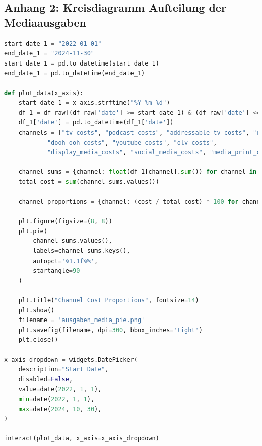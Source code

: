 \documentclass{common/nak}
\numberwithin{equation}{subsection}
\begin{document}
\subsection*{Anhang 2: Kreisdiagramm Aufteilung der Mediaausgaben}
\label{Anhang2KreisdiagrammAufteilungDerMediaausgaben}
\begin{lstlisting}[language=Python, linewidth=\textwidth]
start_date_1 = "2022-01-01"
end_date_1 = "2024-11-30"
start_date_1 = pd.to_datetime(start_date_1)
end_date_1 = pd.to_datetime(end_date_1)

def plot_data(x_axis):
    start_date_1 = x_axis.strftime("%Y-%m-%d")
    df_1 = df_raw[(df_raw['date'] >= start_date_1) & (df_raw['date'] <= end_date_1)].copy() 
    df_1['date'] = pd.to_datetime(df_1['date'])
    channels = ["tv_costs", "podcast_costs", "addressable_tv_costs", "radio_costs", 
            "dooh_ooh_costs", "youtube_costs", "olv_costs", 
            "display_media_costs", "social_media_costs", "media_print_costs"]

    channel_sums = {channel: float(df_1[channel].sum()) for channel in channels}
    total_cost = sum(channel_sums.values())

    channel_proportions = {channel: (cost / total_cost) * 100 for channel, cost in channel_sums.items()}

    plt.figure(figsize=(8, 8))
    plt.pie(
        channel_sums.values(),
        labels=channel_sums.keys(),
        autopct='%1.1f%%',
        startangle=90
    )

    plt.title("Channel Cost Proportions", fontsize=14)
    plt.show()
    filename = 'ausgaben_media_pie.png'
    plt.savefig(filename, dpi=300, bbox_inches='tight')
    plt.close() 

x_axis_dropdown = widgets.DatePicker(
    description="Start Date",
    disabled=False,
    value=date(2022, 1, 1),
    min=date(2022, 1, 1),  
    max=date(2024, 10, 30),
)

interact(plot_data, x_axis=x_axis_dropdown)
\end{lstlisting}
\end{document}

